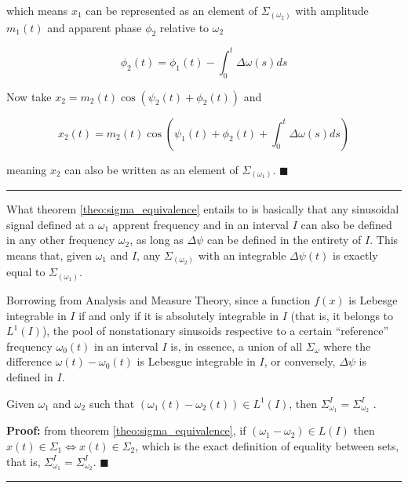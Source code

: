 	which means $x_1$ can be represented as an element of $\Sigma_{\left(\omega_2\right)}$ with amplitude $m_1(t)$ and apparent phase $\phi_2$ relative to $\omega_2$

\small\begin{equation} \phi_2(t) = \phi_1(t) - \int_0^t \Delta\omega(s)ds \label{eq:angle_relationship}\end{equation}\normalsize

	Now take $x_2 = m_2(t)\cos\left(\psi_2(t) + \phi_2(t)\right)$ and

\small\begin{equation} x_2(t) = m_2(t)\cos\left(\psi_1(t) + \phi_2(t) + \int_0^t \Delta\omega(s)ds\right) \end{equation}\normalsize

	meaning $x_2$ can also be written as an element of $\Sigma_{\left(\omega_1\right)}$. \hfill$\blacksquare$ \vspace{5mm}\hrule\vspace{5mm}%

	What theorem \ref{theo:sigma_equivalence} entails to is basically that any sinusoidal signal defined at a $\omega_1$ apprent frequency and in an interval $I$ can also be defined in any other frequency $\omega_2$, as long as $\Delta\psi$ can be defined in the entirety of $I$. This means that, given $\omega_1$ and $I$, any $\Sigma_{\left(\omega_2\right)}$ with an integrable $\Delta\psi(t)$ is exactly equal to $\Sigma_{\left(\omega_1\right)}$.

	Borrowing from Analysis and Measure Theory, since a function $f(x)$ is Lebesge integrable in $I$ if and only if it is absolutely integrable in $I$ (that is, it belongs to $L^1\left(I\right)$), the pool of nonstationary sinusoids respective to a certain ``reference'' frequency $\omega_0(t)$ in an interval $I$ is, in essence, a union of all $\Sigma_\omega$ where the difference $\omega(t) - \omega_0(t)$ is Lebesgue integrable in $I$, or conversely, $\Delta\psi$ is defined in $I$.

\begin{corollary} \label{theo:sigma_spaces_are_equal} Given $\omega_1$ and $\omega_2$ such that $\left(\omega_1(t)-\omega_2(t)\right)\in L^1\left(I\right)$, then $\Sigma_{\omega_1}^I = \Sigma_{\omega_2}^I$ .\end{corollary}
\textbf{Proof:} from theorem \ref{theo:sigma_equivalence}, if $\left(\omega_1 - \omega_2\right)\in L\left(I\right)$ then $x(t)\in\Sigma_1 \Leftrightarrow x(t)\in\Sigma_2$, which is the exact definition of equality between sets, that is, $\Sigma_{\omega_1}^I = \Sigma_{\omega_2}^I$. \hfill$\blacksquare$ \vspace{5mm}\hrule\vspace{5mm}

